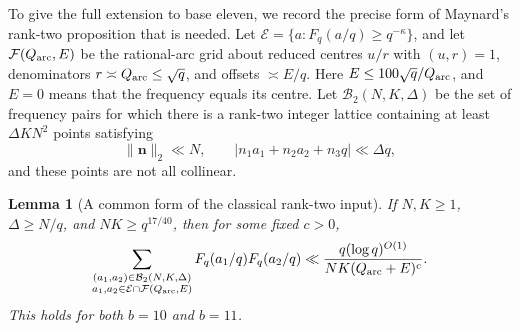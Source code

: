 \documentclass[11pt,a4paper]{article}
\theoremstyle{paperplain}
\newtheorem{lemma}[theorem]{Lemma}
\numberwithin{equation}{section}
\begin{document}
To give the full extension to base eleven, we record the precise form
of Maynard's rank-two proposition that is needed.
Let $\mathcal E=\{a:F_q(a/q)\ge q^{-\kappa}\}$, and let
$\mathcal F(Q_{\rm arc},E)$ be the rational-arc grid about reduced
centres $u/r$ with $(u,r)=1$, denominators
$r\asymp Q_{\rm arc}\le\sqrt q$, and offsets $\asymp E/q$.
Here $E\le100\sqrt q/Q_{\rm arc}$, and $E=0$ means that the
frequency equals its centre.
Let $\mathcal B_2(N,K,\Delta)$ be the set of frequency pairs for which
there is a rank-two integer lattice containing at least $\Delta KN^2$
points satisfying
\[
 \|\mathbf n\|_2\ll N,\qquad
 |n_1a_1+n_2a_2+n_3q|\ll\Delta q,
\]
and these points are not all collinear.

\begin{lemma}[A common form of the classical rank-two input]\label{dec:classicalrank}
If $N,K\ge1$, $\Delta\ge N/q$, and $NK\ge q^{17/40}$,
then for some fixed $c>0$,
\begin{equation}\label{dec:classicalrankbound}
 \sum_{\substack{(a_1,a_2)\in\mathcal B_2(N,K,\Delta)\\
 a_1,a_2\in\mathcal E\cap\mathcal F(Q_{\rm arc},E)}}
 F_q(a_1/q)F_q(a_2/q)
 \ll\frac{q(\log q)^{O(1)}}{NK(Q_{\rm arc}+E)^c}.
\end{equation}
This holds for both $b=10$ and $b=11$.
\end{lemma}
\end{document}
